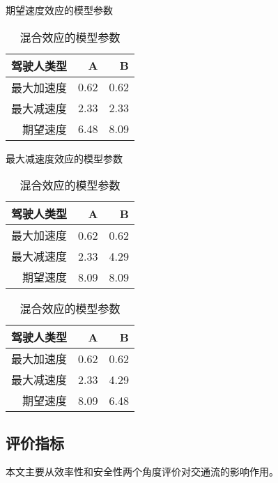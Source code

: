 \begin{table}[htb] 
  \begin{minipage}[b]{0.25\linewidth} 
  \centering
  \caption{期望速度效应的模型参数}
    \begin{tabular}{rrr}
    \addlinespace
    \toprule
    驾驶人类型    & A     & B \\
    \midrule
    最大加速度 & 0.62  & 0.62 \\
    最大减速度 & 2.33  & 2.33 \\
    期望速度  & 6.48  & 8.09 \\
    \bottomrule
    \end{tabular}%
  \label{speed-factor}%
  \end{minipage}%
\hspace{0.08\linewidth}
  \begin{minipage}[b]{0.25\linewidth} 
  \centering
  \caption{最大减速度效应的模型参数}
    \begin{tabular}{rrr}
    \addlinespace
    \toprule
    驾驶人类型    & A     & B \\
    \midrule
    最大加速度 & 0.62  & 0.62 \\
    最大减速度 & 2.33  & 4.29 \\
    期望速度  & 8.09  & 8.09 \\
    \bottomrule
    \end{tabular}%
  \label{decel-factor}%
  \end{minipage}
\hspace{0.08\linewidth}
  \begin{minipage}[b]{0.25\linewidth} 
  \centering
  \caption{混合效应的模型参数}
    \begin{tabular}{rrr}
    \addlinespace
    \toprule
    驾驶人类型    & A     & B \\
    \midrule
    最大加速度 & 0.62  & 0.62 \\
    最大减速度 & 2.33  & 4.29 \\
    期望速度  & 8.09  & 6.48 \\
    \bottomrule
    \end{tabular}%
  \label{combined-factor}%
  \end{minipage} 
\end{table}






\subsection{评价指标}
本文主要从效率性和安全性两个角度评价对交通流的影响作用。

